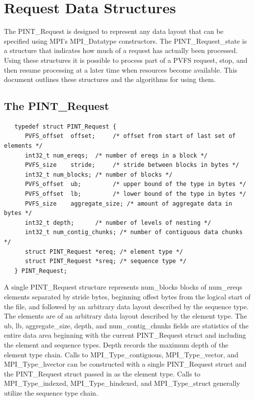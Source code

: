 \documentclass[12pt]{article} %
\begin{document}
\section{Request Data Structures}

The PINT\_Request is designed to represent any data layout that can
be specified using MPI's MPI\_Datatype constructors.  The
PINT\_Request\_state is a structure that indicates how much of a request
has actually been processed.  Using these structures it is possible to
process part of a PVFS request, stop, and then resume processing at a
later time when resources become available.  This document outlines
these structures and the algorithms for using them.

\subsection*{The PINT\_Request}

\begin{verbatim}
   typedef struct PINT_Request {
      PVFS_offset  offset;     /* offset from start of last set of elements */
      int32_t num_ereqs;  /* number of ereqs in a block */
      PVFS_size    stride;     /* stride between blocks in bytes */
      int32_t num_blocks; /* number of blocks */
      PVFS_offset  ub;         /* upper bound of the type in bytes */
      PVFS_offset  lb;         /* lower bound of the type in bytes */
      PVFS_size    aggregate_size; /* amount of aggregate data in bytes */
      int32_t depth;      /* number of levels of nesting */
      int32_t num_contig_chunks; /* number of contiguous data chunks */
      struct PINT_Request *ereq; /* element type */
      struct PINT_Request *sreq; /* sequence type */
   } PINT_Request;
\end{verbatim}

A single PINT\_Request structure represents num\_blocks blocks of
num\_ereqs
elements separated by stride bytes, beginning offest bytes from the
logical start of the file, and followed by an arbitrary data layout
described by the sequence type.  The elements are of an arbitrary
data layout described by the element type.  The ub, lb,
aggregate\_size, depth, and num\_contig\_chunks fields are
statistics of the entire data area beginning with the
current PINT\_Request struct and including the element and sequence
types.  Depth records the maximum depth of the element type chain.
Calls to MPI\_Type\_contiguous, MPI\_Type\_vector, and
MPI\_Type\_hvector can be constructed
with a single PINT\_Request struct and the PINT\_Request struct passed
in as the element type.  Calls to MPI\_Type\_indexed,
MPI\_Type\_hindexed, and MPI\_Type\_struct generally utilize the
sequence type chain.
\end{document}
